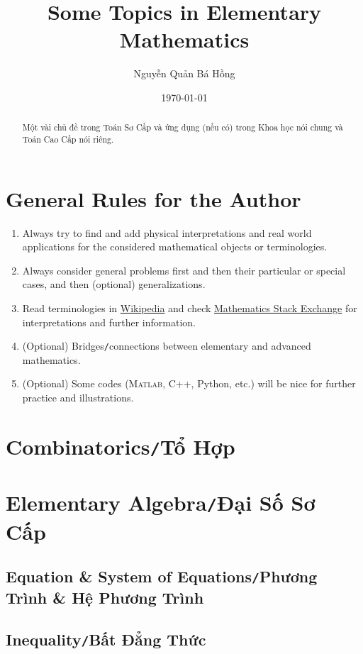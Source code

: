 \documentclass{article}
\title{Some Topics in Elementary Mathematics}
\author{Nguyễn Quản Bá Hồng}
\date{\today}
\numberwithin{equation}{section}
\begin{document}
\maketitle
\begin{abstract}
	Một vài chủ đề trong Toán Sơ Cấp và ứng dụng (nếu có) trong Khoa học nói chung và Toán Cao Cấp nói riêng.
\end{abstract}
\tableofcontents


\section*{General Rules for the Author}
\begin{enumerate}
	\item Always try to find and add physical interpretations and real world applications for the considered mathematical objects or terminologies.
	\item Always consider general problems first and then their particular or special cases, and then (optional) generalizations.
	\item Read terminologies in \href{https://www.wikipedia.org/}{Wikipedia} and check \href{https://math.stackexchange.com/}{Mathematics Stack Exchange} for interpretations and further information.
	\item (Optional) Bridges\texttt{/}connections between elementary and advanced mathematics.
	\item (Optional) Some codes (\textsc{Matlab}, C++, Python, etc.) will be nice for further practice and illustrations.
\end{enumerate}

\section{Combinatorics\texttt{/}Tổ Hợp}

\section{Elementary Algebra\texttt{/}Đại Số Sơ Cấp}

\subsection{Equation \& System of Equations\texttt{/}Phương Trình \& Hệ Phương Trình}

\subsection{Inequality\texttt{/}Bất Đẳng Thức}
\end{document}
